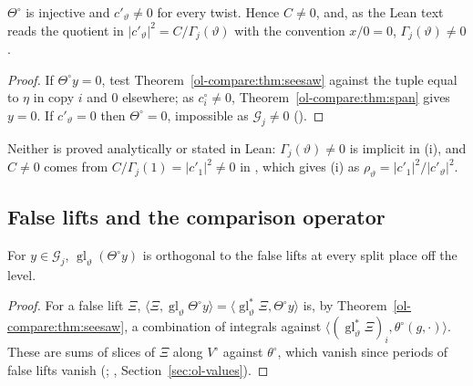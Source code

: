 \begin{corollary}
\label{ol-compare:cor:injective}
$\Theta^\circ$ is injective and $c'_\vartheta\ne0$ for every twist. Hence $C\ne0$, and, as the Lean text reads the
quotient in $|c'_\vartheta|^2=C/\Gamma_j(\vartheta)$ with the convention $x/0=0$, $\Gamma_j(\vartheta)\ne0$.
\end{corollary}

\begin{proof}
If $\Theta^\circ y=0$, test Theorem~\ref{ol-compare:thm:seesaw} against the tuple equal to $\eta$ in copy
$i$ and $0$ elsewhere; as $c^\circ_i\ne0$, Theorem~\ref{ol-compare:thm:span} gives $y=0$. If $c'_\vartheta=0$
then $\Theta^\circ=0$, impossible as $\mathcal G_j\ne0$ ().
\end{proof}

Neither is proved analytically or stated in Lean: $\Gamma_j(\vartheta)\ne0$ is implicit in (i), and
$C\ne0$ comes from $C/\Gamma_j(1)=|c'_1|^2\ne0$ in , which
gives (i) as $\rho_\vartheta=|c'_1|^2/|c'_\vartheta|^2$.

\subsection{False lifts and the comparison operator}\label{ol-compare:sec:assembly}

\begin{proposition}\label{ol-compare:prop:false}
For $y\in\mathcal G_j$, $\operatorname{gl}_\vartheta(\Theta^\circ y)$ is orthogonal to the false lifts at
every split place off the level.
\end{proposition}

\begin{proof}
For a false lift $\Xi$, $\langle\Xi,\operatorname{gl}_\vartheta\Theta^\circ y\rangle=\langle\operatorname{gl}_\vartheta^*\Xi,\Theta^\circ y\rangle$
is, by Theorem~\ref{ol-compare:thm:seesaw}, a combination of integrals against
$\langle(\operatorname{gl}_\vartheta^*\Xi)_i,\theta^\circ(g,\cdot)\rangle$. These are sums of slices of $\Xi$
along $V^\circ$ against $\theta^\circ$, which vanish since periods of false lifts vanish
(; ,
Section~\ref{sec:ol-values}).
\end{proof}

